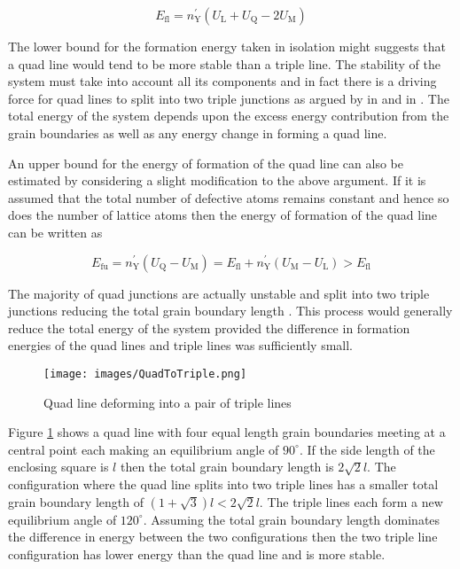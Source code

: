 \documentclass[12pt,a4paper,openany]{report}
\newcommand{\ts}[1]{\textrm{#1}}
\begin{document}
\[E_{\ts{fl}} =  n_{\ts{Y}}^{\prime}(U_{\ts{L}} + U_{\ts{Q}} - 2U_{\ts{M}})\]

The lower bound for the formation energy taken in isolation might suggests that a quad line would tend to be more stable than a triple line. The stability of the system must take into account all its components and in fact there is a driving force for quad lines to split into two triple junctions as argued by \citeauthor{Lazar2011} in \cite{Lazar2011} and \citeauthor{Kinderlehrer2006} in \cite{Kinderlehrer2006}. The total energy of the system depends upon the excess energy contribution from the grain boundaries as well as any energy change in forming a quad line.


An upper bound for the energy of formation of the quad line can also be estimated by considering a slight modification to the above argument. If it is assumed that the total number of defective atoms remains constant and hence so does the number of lattice atoms then the energy of formation of the quad line can
be written as

\[E_{\ts{fu}} =  n_{\ts{Y}}^{\prime}(U_{\ts{Q}} - U_{\ts{M}}) = E_{\ts{fl}} + n_{\ts{Y}}^{\prime}(U_{\ts{M}} - U_{\ts{L}}) > E_{\ts{fl}} \]

The majority of quad junctions are actually unstable and split into two triple junctions reducing the total grain boundary length \cite{Lazar2011,Kinderlehrer2006}. This process would generally reduce the total energy of the system provided the difference in formation energies of the quad lines and triple lines was sufficiently small. 

\begin{figure}[H]
	\centering
	\texttt{[image: images/QuadToTriple.png]} 
	\label{fig:QuadToTriple}
	\caption{Quad line deforming into a pair of triple lines}
\end{figure}

Figure \ref{fig:QuadToTriple} shows a quad line with four equal length grain boundaries meeting at a central point each making an equilibrium angle of $90^{\circ}$. If the side length of the enclosing square is $l$ then the total grain boundary length is $2\sqrt{2}l$. The configuration where the quad line splits into two triple lines has a smaller total grain boundary length of $(1 + \sqrt{3})l < 2\sqrt{2}l$. The triple lines each form a new equilibrium angle of $120^{\circ}$. Assuming the total grain boundary length dominates the difference in energy between the two configurations then the two triple line configuration has lower energy than the quad line and is more stable. 
\end{document}
